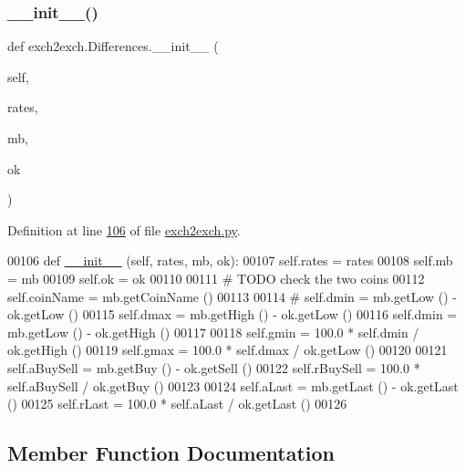 \subsubsection{\texorpdfstring{\+\_\+\+\_\+init\+\_\+\+\_\+()}{\_\_init\_\_()}}
{\footnotesize\ttfamily def exch2exch.\+Differences.\+\_\+\+\_\+init\+\_\+\+\_\+ (\begin{DoxyParamCaption}\item[{}]{self,  }\item[{}]{rates,  }\item[{}]{mb,  }\item[{}]{ok }\end{DoxyParamCaption})}



Definition at line \hyperlink{exch2exch_8py_source_l00106}{106} of file \hyperlink{exch2exch_8py_source}{exch2exch.\+py}.


\begin{DoxyCode}
00106     \textcolor{keyword}{def }\hyperlink{namespacestart__time_a9c9bd378729a13c96a22c8b079ea172c}{\_\_init\_\_} (self, rates, mb, ok):
00107         self.rates = rates
00108         self.mb = mb
00109         self.ok = ok
00110         
00111         \textcolor{comment}{# TODO check the two coins}
00112         self.coinName = mb.getCoinName ()
00113         
00114 \textcolor{comment}{#        self.dmin = mb.getLow ()  - ok.getLow ()   }
00115         self.dmax = mb.getHigh () - ok.getLow ()
00116         self.dmin = mb.getLow () - ok.getHigh ()
00117         
00118         self.gmin = 100.0 * self.dmin / ok.getHigh ()
00119         self.gmax = 100.0 * self.dmax / ok.getLow ()
00120         
00121         self.aBuySell  = mb.getBuy () - ok.getSell ()
00122         self.rBuySell = 100.0 * self.aBuySell / ok.getBuy ()
00123         
00124         self.aLast = mb.getLast () - ok.getLast ()
00125         self.rLast = 100.0 * self.aLast / ok.getLast ()
00126         
\end{DoxyCode}


\subsection{Member Function Documentation}
\mbox{\label{classexch2exch_1_1_differences_af2d3dc1abc5bfb7f84192e03af199c5f}} 
